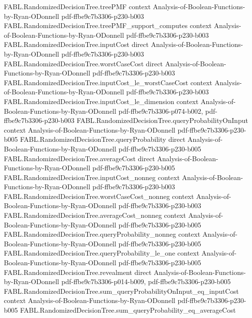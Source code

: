 \begin{theorem}
\proofstep
  {FABL.RandomizedDecisionTree.treePMF}
  {context}
  {Analysis-of-Boolean-Functions-by-Ryan-ODonnell}
  {pdf-ffbe9c7b3306-p230-b003}
\proofstep
  {FABL.RandomizedDecisionTree.treePMF_support_computes}
  {context}
  {Analysis-of-Boolean-Functions-by-Ryan-ODonnell}
  {pdf-ffbe9c7b3306-p230-b003}
\proofstep
  {FABL.RandomizedDecisionTree.inputCost}
  {direct}
  {Analysis-of-Boolean-Functions-by-Ryan-ODonnell}
  {pdf-ffbe9c7b3306-p230-b003}
\proofstep
  {FABL.RandomizedDecisionTree.worstCaseCost}
  {direct}
  {Analysis-of-Boolean-Functions-by-Ryan-ODonnell}
  {pdf-ffbe9c7b3306-p230-b003}
\proofstep
  {FABL.RandomizedDecisionTree.inputCost_le_worstCaseCost}
  {context}
  {Analysis-of-Boolean-Functions-by-Ryan-ODonnell}
  {pdf-ffbe9c7b3306-p230-b003}
\proofstep
  {FABL.RandomizedDecisionTree.inputCost_le_dimension}
  {context}
  {Analysis-of-Boolean-Functions-by-Ryan-ODonnell}
  {pdf-ffbe9c7b3306-p074-b002,
    pdf-ffbe9c7b3306-p230-b003}
\proofstep
  {FABL.RandomizedDecisionTree.queryProbabilityOnInput}
  {context}
  {Analysis-of-Boolean-Functions-by-Ryan-ODonnell}
  {pdf-ffbe9c7b3306-p230-b005}
\proofstep
  {FABL.RandomizedDecisionTree.queryProbability}
  {direct}
  {Analysis-of-Boolean-Functions-by-Ryan-ODonnell}
  {pdf-ffbe9c7b3306-p230-b005}
\proofstep
  {FABL.RandomizedDecisionTree.averageCost}
  {direct}
  {Analysis-of-Boolean-Functions-by-Ryan-ODonnell}
  {pdf-ffbe9c7b3306-p230-b005}
\proofstep
  {FABL.RandomizedDecisionTree.inputCost_nonneg}
  {context}
  {Analysis-of-Boolean-Functions-by-Ryan-ODonnell}
  {pdf-ffbe9c7b3306-p230-b003}
\proofstep
  {FABL.RandomizedDecisionTree.worstCaseCost_nonneg}
  {context}
  {Analysis-of-Boolean-Functions-by-Ryan-ODonnell}
  {pdf-ffbe9c7b3306-p230-b003}
\proofstep
  {FABL.RandomizedDecisionTree.averageCost_nonneg}
  {context}
  {Analysis-of-Boolean-Functions-by-Ryan-ODonnell}
  {pdf-ffbe9c7b3306-p230-b005}
\proofstep
  {FABL.RandomizedDecisionTree.queryProbability_nonneg}
  {context}
  {Analysis-of-Boolean-Functions-by-Ryan-ODonnell}
  {pdf-ffbe9c7b3306-p230-b005}
\proofstep
  {FABL.RandomizedDecisionTree.queryProbability_le_one}
  {context}
  {Analysis-of-Boolean-Functions-by-Ryan-ODonnell}
  {pdf-ffbe9c7b3306-p230-b005}
\proofstep
  {FABL.RandomizedDecisionTree.revealment}
  {direct}
  {Analysis-of-Boolean-Functions-by-Ryan-ODonnell}
  {pdf-ffbe9c7b3306-p014-b009,
    pdf-ffbe9c7b3306-p230-b005}
\proofstep
  {FABL.RandomizedDecisionTree.sum_queryProbabilityOnInput_eq_inputCost}
  {context}
  {Analysis-of-Boolean-Functions-by-Ryan-ODonnell}
  {pdf-ffbe9c7b3306-p230-b005}
\proofstep
  {FABL.RandomizedDecisionTree.sum_queryProbability_eq_averageCost}

\end{theorem}
